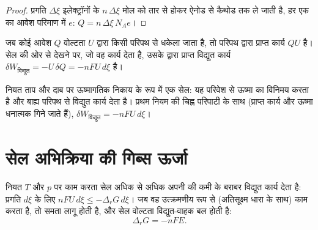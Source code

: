 \begin{proof}
प्रगति $\Delta\xi$ इलेक्ट्रॉनों के $n\,\Delta\xi$ मोल को तार से होकर
ऐनोड से कैथोड तक ले जाती है, हर एक का आवेश परिमाण में $e$:
$Q = n\,\Delta\xi\,N_A e$।
\end{proof}

जब कोई आवेश $Q$ वोल्टता $U$ द्वारा किसी परिपथ से धकेला जाता है, तो परिपथ द्वारा
प्राप्त कार्य $QU$ है। सेल की ओर से देखने पर, जो वह कार्य देता है,
उसके द्वारा प्राप्त विद्युत कार्य $\delta W_{\text{विद्युत}} = -U\,\delta Q = -nFU\,
d\xi$ है।

\begin{omfigure}

{\small नियत ताप और दाब पर ऊष्मागतिक निकाय के रूप में एक सेल:
यह परिवेश से ऊष्मा का विनिमय करता है और बाह्य परिपथ से विद्युत कार्य
देता है। प्रथम नियम की चिह्न परिपाटी के साथ (प्राप्त कार्य और ऊष्मा
धनात्मक गिने जाते हैं), $\delta W_{\text{विद्युत}} = -nFU\,d\xi$।}
\end{omfigure}

\section{सेल अभिक्रिया की गिब्स ऊर्जा}

\begin{theorem}[विद्युत कार्य और गिब्स ऊर्जा]\label{thm:b2:cell-thermodynamics:delta-g-nfe}
नियत $T$ और $p$ पर काम करता सेल अधिक से अधिक अपनी  की कमी के बराबर
विद्युत कार्य देता है: प्रगति $d\xi$ के लिए
$nFU\,d\xi \leq -\Delta_r G\,d\xi$। जब वह उत्क्रमणीय रूप से (अतिसूक्ष्म
धारा के साथ) काम करता है, तो समता लागू होती है, और सेल वोल्टता
विद्युत-वाहक बल होती है:
\[
  \Delta_r G = -nFE .
\]
\end{theorem}

